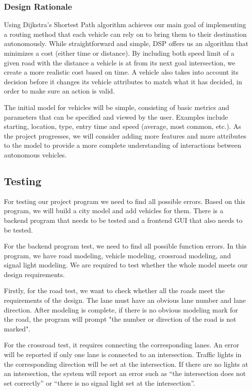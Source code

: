 \documentclass[onecolumn, draftclsnofoot,10pt, compsoc]{IEEEtran}
\begin{document}
\subsubsection{Design Rationale}
Using Dijkstra’s Shortest Path algorithm achieves our main goal of implementing a routing method that each vehicle can rely on to bring them to their destination autonomously.
While straightforward and simple, DSP offers us an algorithm that minimizes a cost (either time or distance).
By including both speed limit of a given road with the distance a vehicle is at from its next goal intersection, we create a more realistic cost based on time.
A vehicle also takes into account its decision before it changes its vehicle attributes to match what it has decided, in order to make sure an action is valid.

The initial model for vehicles will be simple, consisting of basic metrics and parameters that can be specified and viewed by the user.
Examples include starting, location, type, entry time and speed (average, most common, etc.).
As the project progresses, we will consider adding more features and more attributes to the model to provide a more complete understanding of interactions between autonomous vehicles.
\subsection{Testing}
For testing our project program we need to find all possible errors.
Based on this program, we will build a city model and add vehicles for them.
There is a backend program that needs to be tested and a frontend GUI that also needs to be tested.

For the backend program test, we need to find all possible function errors.
In this program, we have road modeling, vehicle modeling, crossroad modeling, and signal light modeling.
We are required to test whether the whole model meets our design requirements.

Firstly, for the road test, we want to check whether all the roads meet the requirements of the design.
The lane must have an obvious lane number and lane direction.
After modeling is complete, if there is no obvious modeling mark for the road, the program will prompt "the number or direction of the road is not marked".

For the crossroad test, it requires connecting the corresponding lanes.
An error will be reported if only one lane is connected to an intersection.
Traffic lights in the corresponding direction will be set at the intersection.
If there are no lights at an intersection, the system will report an error such as “the intersection does not set correctly” or “there is no signal light set at the intersection”.
\end{document}
